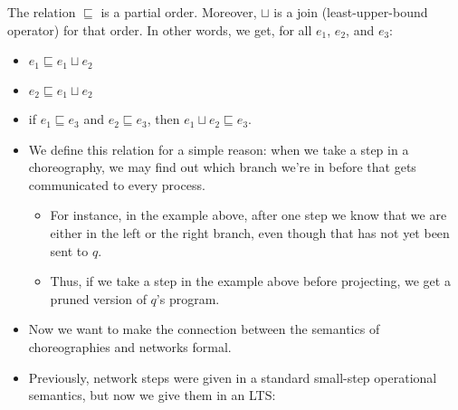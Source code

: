 \documentclass{lecturenotes}
\newcommand{\unit}{\ensuremath{\textsf{(}\mkern0.5mu\textsf{)}}}
\newcommand{\send}[2]{\ensuremath{\textsf{send}~#1 \mathrel{\textsf{to}} #2}}
\newcommand{\recv}[3]{\ensuremath{\textsf{receive}~#1 \mathrel{\textsf{from}} #2} \mathrel{\textsf{in}} #3}
\newcommand{\Left}{\textsf{left}\xspace}
\newcommand{\Right}{\textsf{right}\xspace}
\newcommand{\choosefor}[2]{\ensuremath{\textsf{choose}~#1 \mathrel{\textsf{for}} #2}}
\newcommand{\letchoose}[3]{\ensuremath{\textsf{let}~#1 \mathrel{\textsf{choose}} (\Left \Rightarrow #2; \Right \Rightarrow #3)}}
\newcommand{\letchooseL}[2]{\ensuremath{\textsf{let}~#1 \mathrel{\textsf{choose}} (\Left \Rightarrow #2)}}
\newcommand{\letchooseR}[2]{\ensuremath{\textsf{let}~#1 \mathrel{\textsf{choose}} (\Right \Rightarrow #2)}}
\newcommand{\ret}[1]{\ensuremath{\textsf{ret}(#1)}}
\begin{document}

\begin{thm}
  The relation $\sqsubseteq$ is a partial order.
  Moreover, $\sqcup$ is a join (least-upper-bound operator) for that order.
  In other words, we get, for all $e_1$, $e_2$, and $e_3$:
  \begin{itemize}
  \item $e_1 \sqsubseteq e_1 \sqcup e_2$
  \item $e_2 \sqsubseteq e_1 \sqcup e_2$
  \item if $e_1 \sqsubseteq e_3$ and $e_2 \sqsubseteq e_3$, then $e_1 \sqcup e_2 \sqsubseteq e_3$.
  \end{itemize}
\end{thm}

\begin{itemize}
\item We define this relation for a simple reason: when we take a step in a choreography, we may find out which branch we're in before that gets communicated to every process.
  \begin{itemize}
  \item For instance, in the example above, after one step we know that we are either in the \Left or the \Right branch, even though that has not yet been sent to $q$.
  \item Thus, if we take a step in the example above before projecting, we get a pruned version of $q$'s program.
  \end{itemize}
\item Now we want to make the connection between the semantics of choreographies and networks formal.
\item Previously, network steps were given in a standard small-step operational semantics, but now we give them in an LTS:
\end{itemize}
\end{document}

